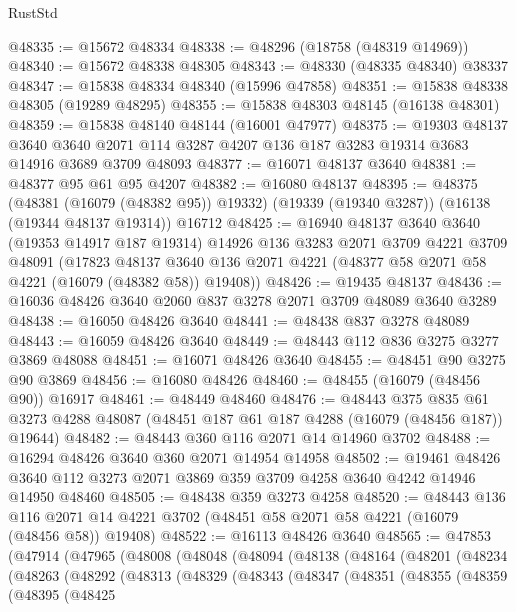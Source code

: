 \begin{lexlean}{RustStd}
\begin{coremodule}
@48335 := @15672 @48334
@48338 := @48296 (@18758 (@48319 @14969))
@48340 := @15672 @48338 @48305
@48343 := @48330 (@48335 @48340) @38337
@48347 := @15838 @48334 @48340 (@15996 @47858)
@48351 := @15838 @48338 @48305 (@19289 @48295)
@48355 := @15838 @48303 @48145 (@16138 @48301)
@48359 := @15838 @48140 @48144 (@16001 @47977)
@48375 := @19303
    @48137
    @3640
    @3640
    @2071
    @114
    @3287
    @4207
    @136
    @187
    @3283
    @19314
    @3683
    @14916
    @3689
    @3709
    @48093
@48377 := @16071 @48137 @3640
@48381 := @48377 @95 @61 @95 @4207
@48382 := @16080 @48137
@48395 := @48375
    (@48381 (@16079 (@48382 @95)) @19332)
    (@19339 (@19340 @3287))
    (@16138 (@19344 @48137 @19314))
    @16712
@48425 := @16940
    @48137
    @3640
    @3640
    (@19353 @14917 @187 @19314)
    @14926
    @136
    @3283
    @2071
    @3709
    @4221
    @3709
    @48091
    (@17823 @48137 @3640 @136 @2071 @4221 (@48377 @58 @2071 @58 @4221 (@16079 (@48382 @58)) @19408))
@48426 := @19435 @48137
@48436 := @16036 @48426 @3640 @2060 @837 @3278 @2071 @3709 @48089 @3640 @3289
@48438 := @16050 @48426 @3640
@48441 := @48438 @837 @3278 @48089
@48443 := @16059 @48426 @3640
@48449 := @48443 @112 @836 @3275 @3277 @3869 @48088
@48451 := @16071 @48426 @3640
@48455 := @48451 @90 @3275 @90 @3869
@48456 := @16080 @48426
@48460 := @48455 (@16079 (@48456 @90)) @16917
@48461 := @48449 @48460
@48476 := @48443
    @375
    @835
    @61
    @3273
    @4288
    @48087
    (@48451 @187 @61 @187 @4288 (@16079 (@48456 @187)) @19644)
@48482 := @48443 @360 @116 @2071 @14 @14960 @3702
@48488 := @16294 @48426 @3640 @360 @2071 @14954 @14958
@48502 := @19461
    @48426
    @3640
    @112
    @3273
    @2071
    @3869
    @359
    @3709
    @4258
    @3640
    @4242
    @14946
    @14950
    @48460
@48505 := @48438 @359 @3273 @4258
@48520 := @48443
    @136
    @116
    @2071
    @14
    @4221
    @3702
    (@48451 @58 @2071 @58 @4221 (@16079 (@48456 @58)) @19408)
@48522 := @16113 @48426 @3640
@48565 := @47853
    (@47914
      (@47965
        (@48008
          (@48048
            (@48094
              (@48138
                (@48164
                  (@48201
                    (@48234
                      (@48263
                        (@48292
                          (@48313
                            (@48329
                              (@48343
                                (@48347
                                  (@48351
                                    (@48355
                                      (@48359
                                        (@48395
                                          (@48425

\end{coremodule}
\end{lexlean}
